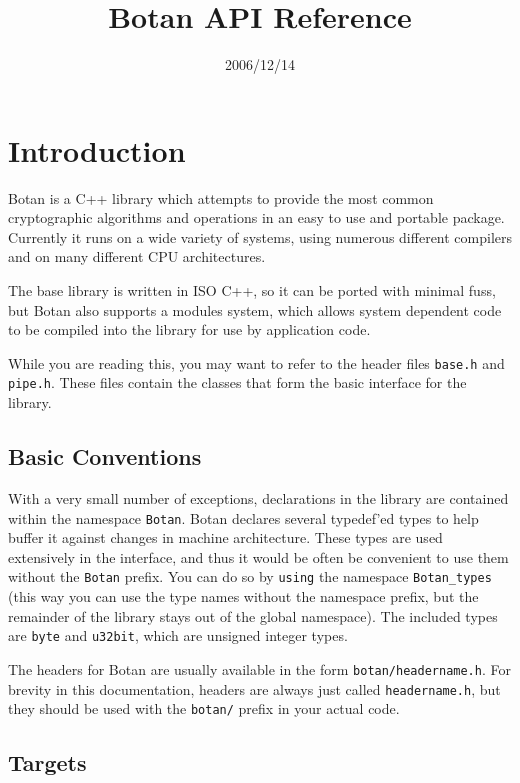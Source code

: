 \documentclass{article}
\title{\textbf{Botan API Reference}}
\author{}
\date{2006/12/14}
\newcommand{\filename}[1]{\texttt{#1}}
\newcommand{\keyword}[1]{\texttt{#1}}
\newcommand{\type}[1]{\texttt{#1}}
\newcommand{\namespace}[1]{\texttt{#1}}
\begin{document}
\maketitle

\tableofcontents

\parskip=5pt
\pagebreak

\section{Introduction}

Botan is a C++ library which attempts to provide the most common cryptographic
algorithms and operations in an easy to use and portable package. Currently it
runs on a wide variety of systems, using numerous different compilers and on
many different CPU architectures.

The base library is written in ISO C++, so it can be ported with minimal fuss,
but Botan also supports a modules system, which allows system dependent code
to be compiled into the library for use by application code.

While you are reading this, you may want to refer to the header files
\filename{base.h} and \filename{pipe.h}. These files contain the classes that
form the basic interface for the library.

\subsection{Basic Conventions}

With a very small number of exceptions, declarations in the library are
contained within the namespace \namespace{Botan}. Botan declares several
typedef'ed types to help buffer it against changes in machine architecture.
These types are used extensively in the interface, and thus it would be often
be convenient to use them without the \namespace{Botan} prefix. You can do so
by \keyword{using} the namespace \namespace{Botan\_types} (this way you can use
the type names without the namespace prefix, but the remainder of the library
stays out of the global namespace). The included types are \type{byte} and
\type{u32bit}, which are unsigned integer types.

The headers for Botan are usually available in the form
\filename{botan/headername.h}. For brevity in this documentation,
headers are always just called \filename{headername.h}, but they
should be used with the \filename{botan/} prefix in your actual code.

\subsection{Targets}
\end{document}
